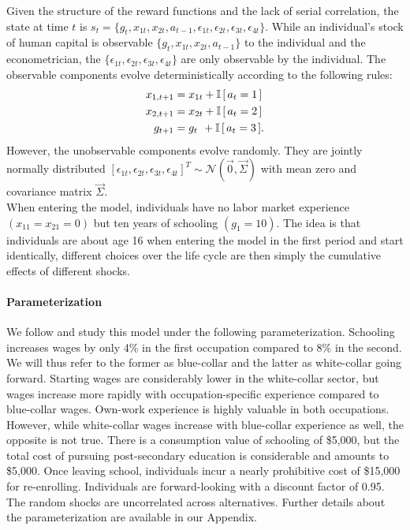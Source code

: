 \noindent Given the structure of the reward functions and the lack of serial correlation, the state at time $t$ is $s_t = \{g_t,x_{1t},x_{2t},a_{t - 1},\epsilon_{1t},\epsilon_{2t},\epsilon_{3t},\epsilon_{4t}\}$.
%
While an individual's stock of human capital is observable $\{g_t,x_{1t},x_{2t},a_{t - 1}\}$ to the individual and the econometrician, the $\{\epsilon_{1t},\epsilon_{2t},\epsilon_{3t},\epsilon_{4t}\}$ are only observable by the individual. The observable components evolve deterministically according to the following rules:
%
\begin{align*}
    x_{1,t+1}  &= x_{1t} + \mathbb{I}\,[\,a_t = 1\,] \\
x_{2,t+1} &= x_{2t} + \mathbb{I}\,[\,a_t = 2\,] \\
g_{t+1}   &= g_{t\phantom{2}}    +  \mathbb{I}\,[\,a_t = 3\,].
\end{align*}
%
However, the unobservable components evolve randomly. They are jointly normally distributed  $[\epsilon_{1t}, \epsilon_{2t}, \epsilon_{3t}, \epsilon_{4t}]^T \sim \mathcal{N}(\vec{0}, \vec{\Sigma})$ with mean zero and covariance matrix $\vec{\Sigma}$.\\

\noindent When entering the model, individuals have no labor market experience $(x_{11} = x_{21} = 0)$ but ten years of schooling $(g_1 = 10)$. The idea is that individuals are about age 16 when entering the model in the first period and start identically, different choices over the life cycle are then simply the cumulative effects of different shocks.

\paragraph{Parameterization} We follow \citet{Keane.1994} and study this model under the following parameterization. Schooling increases wages by only 4\% in the first occupation compared to 8\% in the second. We will thus refer to the former as blue-collar and the latter as white-collar going forward. Starting wages are considerably lower in the white-collar sector, but wages increase more rapidly with occupation-specific experience compared to blue-collar wages. Own-work experience is highly valuable in both occupations. However, while white-collar wages increase with blue-collar experience as well, the opposite is not true. There is a consumption value of schooling of \$5,000, but the total cost of pursuing post-secondary education is considerable and amounts to \$5,000. Once leaving school, individuals incur a nearly prohibitive cost of \$15,000 for re-enrolling. Individuals are forward-looking with a discount factor of 0.95. The random shocks are uncorrelated across alternatives. Further details about the parameterization are available in our Appendix.

